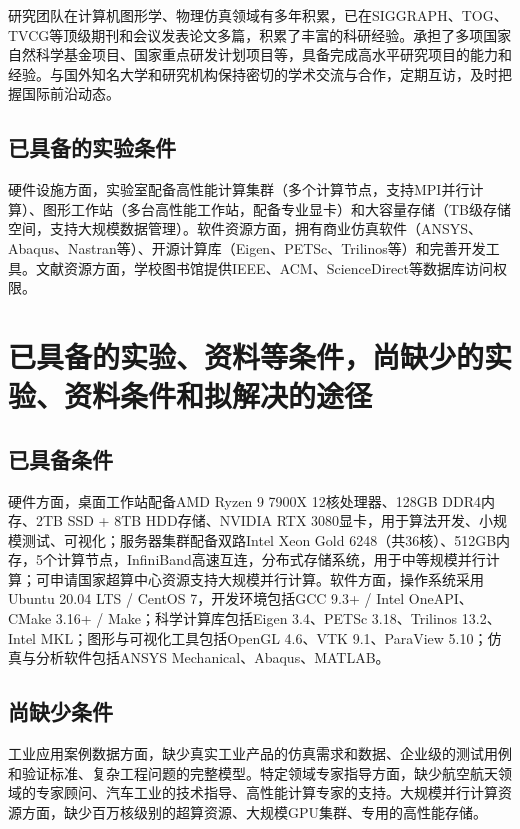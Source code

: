 研究团队在计算机图形学、物理仿真领域有多年积累，已在SIGGRAPH、TOG、TVCG等顶级期刊和会议发表论文多篇，积累了丰富的科研经验。承担了多项国家自然科学基金项目、国家重点研发计划项目等，具备完成高水平研究项目的能力和经验。与国外知名大学和研究机构保持密切的学术交流与合作，定期互访，及时把握国际前沿动态。

\subsection{已具备的实验条件}

硬件设施方面，实验室配备高性能计算集群（多个计算节点，支持MPI并行计算）、图形工作站（多台高性能工作站，配备专业显卡）和大容量存储（TB级存储空间，支持大规模数据管理）。软件资源方面，拥有商业仿真软件（ANSYS、Abaqus、Nastran等）、开源计算库（Eigen、PETSc、Trilinos等）和完善开发工具。文献资源方面，学校图书馆提供IEEE、ACM、ScienceDirect等数据库访问权限。

\section{已具备的实验、资料等条件，尚缺少的实验、资料条件和拟解决的途径}

\subsection{已具备条件}

硬件方面，桌面工作站配备AMD Ryzen 9 7900X 12核处理器、128GB DDR4内存、2TB SSD + 8TB HDD存储、NVIDIA RTX 3080显卡，用于算法开发、小规模测试、可视化；服务器集群配备双路Intel Xeon Gold 6248（共36核）、512GB内存，5个计算节点，InfiniBand高速互连，分布式存储系统，用于中等规模并行计算；可申请国家超算中心资源支持大规模并行计算。软件方面，操作系统采用Ubuntu 20.04 LTS / CentOS 7，开发环境包括GCC 9.3+ / Intel OneAPI、CMake 3.16+ / Make；科学计算库包括Eigen 3.4、PETSc 3.18、Trilinos 13.2、Intel MKL；图形与可视化工具包括OpenGL 4.6、VTK 9.1、ParaView 5.10；仿真与分析软件包括ANSYS Mechanical、Abaqus、MATLAB。

\subsection{尚缺少条件}

工业应用案例数据方面，缺少真实工业产品的仿真需求和数据、企业级的测试用例和验证标准、复杂工程问题的完整模型。特定领域专家指导方面，缺少航空航天领域的专家顾问、汽车工业的技术指导、高性能计算专家的支持。大规模并行计算资源方面，缺少百万核级别的超算资源、大规模GPU集群、专用的高性能存储。

